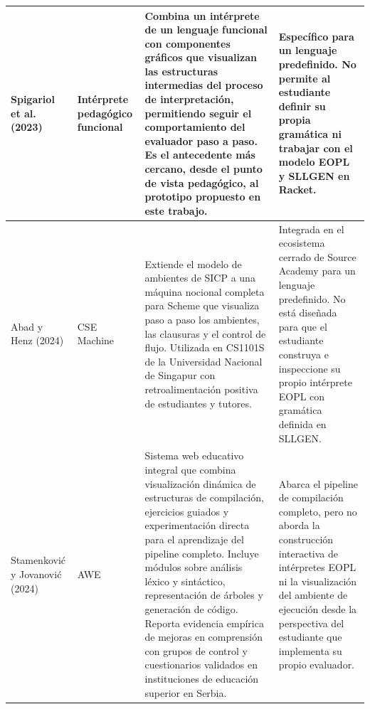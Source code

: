 {\begin{longtable}{
  >{\raggedright\arraybackslash}p{2.3cm}
  >{\raggedright\arraybackslash}p{2.0cm}
  >{\raggedright\arraybackslash}p{5.0cm}
  >{\raggedright\arraybackslash}p{3.5cm}
}
\hline
Spigariol et al. (2023) \cite{Spigariol2023Aprendiendo} &
  Intérprete pedagógico funcional &
  Combina un intérprete de un lenguaje funcional con componentes gráficos que visualizan las estructuras intermedias del proceso de interpretación, permitiendo seguir el comportamiento del evaluador paso a paso. Es el antecedente más cercano, desde el punto de vista pedagógico, al prototipo propuesto en este trabajo. &
  Específico para un lenguaje predefinido. No permite al estudiante definir su propia gramática ni trabajar con el modelo EOPL y SLLGEN en Racket. \\
\hline
Abad y Henz (2024) \cite{Abad2024BeyondSICP} &
  CSE Machine &
  Extiende el modelo de ambientes de SICP a una máquina nocional completa para Scheme que visualiza paso a paso los ambientes, las clausuras y el control de flujo. Utilizada en CS1101S de la Universidad Nacional de Singapur con retroalimentación positiva de estudiantes y tutores. &
  Integrada en el ecosistema cerrado de Source Academy para un lenguaje predefinido. No está diseñada para que el estudiante construya e inspeccione su propio intérprete EOPL con gramática definida en SLLGEN. \\
\hline
Stamenković y Jovanović (2024) \cite{Stamenkovic2024AWE} &
  AWE &
  Sistema web educativo integral que combina visualización dinámica de estructuras de compilación, ejercicios guiados y experimentación directa para el aprendizaje del pipeline completo. Incluye módulos sobre análisis léxico y sintáctico, representación de árboles y generación de código. Reporta evidencia empírica de mejoras en comprensión con grupos de control y cuestionarios validados en instituciones de educación superior en Serbia. &
  Abarca el pipeline de compilación completo, pero no aborda la construcción interactiva de intérpretes EOPL ni la visualización del ambiente de ejecución desde la perspectiva del estudiante que implementa su propio evaluador. \\
\end{longtable}
}

